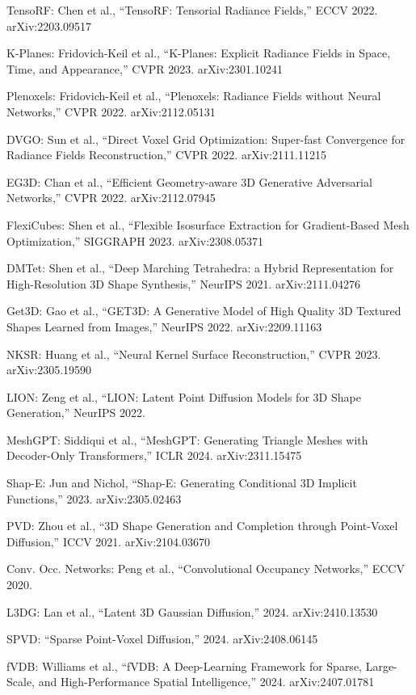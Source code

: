\documentclass[11pt, a4paper]{article}
\begin{document}
\begin{enumerate}[label={[\arabic*]}]
    \item TensoRF: Chen et al., ``TensoRF: Tensorial Radiance Fields,'' ECCV 2022. arXiv:2203.09517
    \item K-Planes: Fridovich-Keil et al., ``K-Planes: Explicit Radiance Fields in Space, Time, and Appearance,'' CVPR 2023. arXiv:2301.10241
    \item Plenoxels: Fridovich-Keil et al., ``Plenoxels: Radiance Fields without Neural Networks,'' CVPR 2022. arXiv:2112.05131
    \item DVGO: Sun et al., ``Direct Voxel Grid Optimization: Super-fast Convergence for Radiance Fields Reconstruction,'' CVPR 2022. arXiv:2111.11215
    \item EG3D: Chan et al., ``Efficient Geometry-aware 3D Generative Adversarial Networks,'' CVPR 2022. arXiv:2112.07945
    \item FlexiCubes: Shen et al., ``Flexible Isosurface Extraction for Gradient-Based Mesh Optimization,'' SIGGRAPH 2023. arXiv:2308.05371
    \item DMTet: Shen et al., ``Deep Marching Tetrahedra: a Hybrid Representation for High-Resolution 3D Shape Synthesis,'' NeurIPS 2021. arXiv:2111.04276
    \item Get3D: Gao et al., ``GET3D: A Generative Model of High Quality 3D Textured Shapes Learned from Images,'' NeurIPS 2022. arXiv:2209.11163
    \item NKSR: Huang et al., ``Neural Kernel Surface Reconstruction,'' CVPR 2023. arXiv:2305.19590
    \item LION: Zeng et al., ``LION: Latent Point Diffusion Models for 3D Shape Generation,'' NeurIPS 2022.
    \item MeshGPT: Siddiqui et al., ``MeshGPT: Generating Triangle Meshes with Decoder-Only Transformers,'' ICLR 2024. arXiv:2311.15475
    \item Shap-E: Jun and Nichol, ``Shap-E: Generating Conditional 3D Implicit Functions,'' 2023. arXiv:2305.02463
    \item PVD: Zhou et al., ``3D Shape Generation and Completion through Point-Voxel Diffusion,'' ICCV 2021. arXiv:2104.03670
    \item Conv. Occ. Networks: Peng et al., ``Convolutional Occupancy Networks,'' ECCV 2020.
    \item L3DG: Lan et al., ``Latent 3D Gaussian Diffusion,'' 2024. arXiv:2410.13530
    \item SPVD: ``Sparse Point-Voxel Diffusion,'' 2024. arXiv:2408.06145
    \item fVDB: Williams et al., ``fVDB: A Deep-Learning Framework for Sparse, Large-Scale, and High-Performance Spatial Intelligence,'' 2024. arXiv:2407.01781
\end{enumerate}
\end{document}
